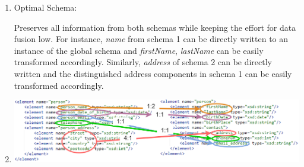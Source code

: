 \documentclass{scrartcl}
\begin{document}
	\begin{enumerate}
		\item Optimal Schema:
		\begin{center}
		\end{center}
		Preserves all information from both schemas while keeping the effort for data fusion low.
		For instance, \textit{name} from schema 1 can be directly written to an instance of the global schema and \textit{firstName}, \textit{lastName} can be easily transformed accordingly. Similarly, \textit{address} of schema 2 can be directly written and the distinguished address components in schema 1 can be easily transformed accordingly.
		
		\item\phantom{phantom}
		\begin{center}
			\hspace*{-4cm}
			\includegraphics[width=1.5\textwidth]{figures/3b.png}
		\end{center}
		

\end{enumerate}
\end{document}
